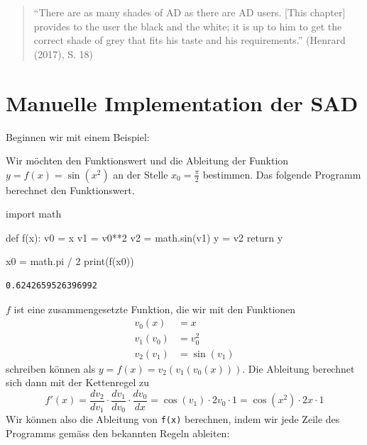 \documentclass[
  letterpaper,
  DIV=11,
  oneside]{scrreprt}
\newenvironment{Shaded}{\begin{snugshade}}{\end{snugshade}}
\newcommand{\BuiltInTok}[1]{\textcolor[rgb]{0.00,0.23,0.31}{#1}}
\newcommand{\ControlFlowTok}[1]{\textcolor[rgb]{0.00,0.23,0.31}{#1}}
\newcommand{\DecValTok}[1]{\textcolor[rgb]{0.68,0.00,0.00}{#1}}
\newcommand{\ImportTok}[1]{\textcolor[rgb]{0.00,0.46,0.62}{#1}}
\newcommand{\KeywordTok}[1]{\textcolor[rgb]{0.00,0.23,0.31}{#1}}
\newcommand{\NormalTok}[1]{\textcolor[rgb]{0.00,0.23,0.31}{#1}}
\newcommand{\OperatorTok}[1]{\textcolor[rgb]{0.37,0.37,0.37}{#1}}
\theoremstyle{definition}
\theoremstyle{definition}
\theoremstyle{remark}
\begin{document}
\begin{quote}
``There are as many shades of AD as there are AD users. {[}This
chapter{]} provides to the user the black and the white; it is up to him
to get the correct shade of grey that fits his taste and his
requirements.'' (Henrard (2017), S. 18)
\end{quote}

\hypertarget{sec-SadManualImplementation}{%
\section{Manuelle Implementation der
SAD}\label{sec-SadManualImplementation}}

Beginnen wir mit einem Beispiel:

Wir möchten den Funktionswert und die Ableitung der Funktion
\(y=f(x)=\sin(x^2)\) an der Stelle \(x_0=\frac{\pi}{2}\) bestimmen. Das
folgende Programm berechnet den Funktionswert.

\begin{Shaded}
\begin{Highlighting}[]
\ImportTok{import}\NormalTok{ math}

\KeywordTok{def}\NormalTok{ f(x):}
\NormalTok{    v0 }\OperatorTok{=}\NormalTok{ x}
\NormalTok{    v1 }\OperatorTok{=}\NormalTok{ v0}\OperatorTok{**}\DecValTok{2}
\NormalTok{    v2 }\OperatorTok{=}\NormalTok{ math.sin(v1)}
\NormalTok{    y }\OperatorTok{=}\NormalTok{ v2}
    \ControlFlowTok{return}\NormalTok{ y}

\NormalTok{x0 }\OperatorTok{=}\NormalTok{ math.pi }\OperatorTok{/} \DecValTok{2}
\BuiltInTok{print}\NormalTok{(f(x0))}
\end{Highlighting}
\end{Shaded}

\begin{verbatim}
0.6242659526396992
\end{verbatim}

\(f\) ist eine zusammengesetzte Funktion, die wir mit den Funktionen \[
\begin{flalign}
    v_0(x)   &= x \\
    v_1(v_0) &= v_0 ^2 \\
    v_2(v_1) &= \sin(v_1)
\end{flalign}
\] schreiben können als \(y=f(x)=v_2(v_1(v_0(x)))\). Die Ableitung
berechnet sich dann mit der Kettenregel zu \[
f'(x) = \frac{dv_2}{dv_1} \cdot \frac{dv_1}{dv_0} \cdot \frac{dv_0}{dx} = \cos(v_1)\cdot 2v_0 \cdot 1 = \cos(x^2) \cdot 2x \cdot 1
\] Wir können also die Ableitung von \texttt{f(x)} berechnen, indem wir
jede Zeile des Programms gemäss den bekannten Regeln ableiten:
\end{document}

